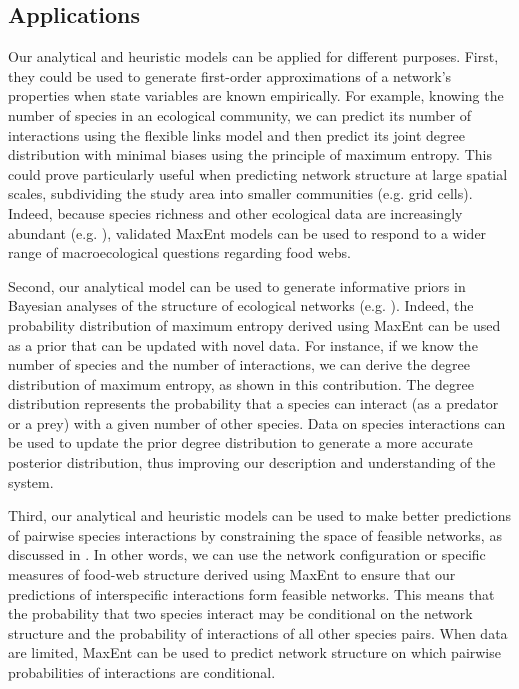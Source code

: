 \subsection{Applications}

Our analytical and heuristic models can be applied for different purposes.
First, they could be used to generate first-order approximations of a network's
properties when state variables are known empirically. For example, knowing the
number of species in an ecological community, we can predict its number of
interactions using the flexible links model and then predict its joint degree
distribution with minimal biases using the principle of maximum entropy. This
could prove particularly useful when predicting network structure at large
spatial scales, subdividing the study area into smaller communities (e.g. grid
cells). Indeed, because species richness and other ecological data are
increasingly abundant (e.g. \cite{Dickinson2010Citizen}), validated MaxEnt models
can be used to respond to a wider range of macroecological questions regarding
food webs. 

Second, our analytical model can be used to generate informative priors in
Bayesian analyses of the structure of ecological networks (e.g.
\cite{Cirtwill2019Quantitative}). Indeed, the probability distribution of maximum
entropy derived using MaxEnt can be used as a prior that can be updated with
novel data. For instance, if we know the number of species and the number of
interactions, we can derive the degree distribution of maximum entropy, as shown
in this contribution. The degree distribution represents the probability that a
species can interact (as a predator or a prey) with a given number of other
species. Data on species interactions can be used to update the prior degree
distribution to generate a more accurate posterior distribution, thus improving
our description and understanding of the system.

Third, our analytical and heuristic models can be used to make better
predictions of pairwise species interactions by constraining the space of
feasible networks, as discussed in \cite{Strydom2021Roadmapa}. In other words, we
can use the network configuration or specific measures of food-web structure
derived using MaxEnt to ensure that our predictions of interspecific
interactions form feasible networks. This means that the probability that two
species interact may be conditional on the network structure and the probability
of interactions of all other species pairs. When data are limited, MaxEnt can be
used to predict network structure on which pairwise probabilities of
interactions are conditional.

